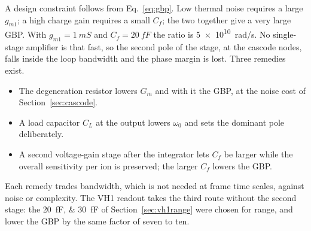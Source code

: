 \documentclass[11pt,a4paper]{article}
\newcommand{\Cf}{\ensuremath{C_f}}
\begin{document}
A design constraint follows from Eq.~\eqref{eq:gbp}. Low
thermal noise requires a large $g_{m1}$; a high charge gain requires a small
$\Cf$; the two together give a very large GBP. With $g_{m1}=\SI{1}{mS}$ and
$\Cf=\SI{20}{fF}$ the ratio is \SI{5e10}{rad/s}. No single-stage amplifier is that fast, so the second pole of the stage, at the cascode nodes, falls inside
the loop bandwidth and the phase margin is lost. Three remedies exist.
%
\begin{itemize}
\item The degeneration resistor lowers $G_m$ and with it the GBP, at the
  noise cost of Section~\ref{sec:cascode}.
\item A load capacitor $C_L$ at the output lowers $\omega_0$ and sets the
  dominant pole deliberately.
\item A second voltage-gain stage after the integrator lets $\Cf$ be larger
  while the overall sensitivity per ion is preserved; the larger $\Cf$ lowers
  the GBP.
\end{itemize}
%
Each remedy trades bandwidth, which is not needed at frame time scales,
against noise or complexity. The VH1 readout takes the third route without
the second stage: the \SIlist{20;30}{fF} of Section~\ref{sec:vh1range} were
chosen for range, and lower the GBP by the same factor of seven to ten.

\end{document}
